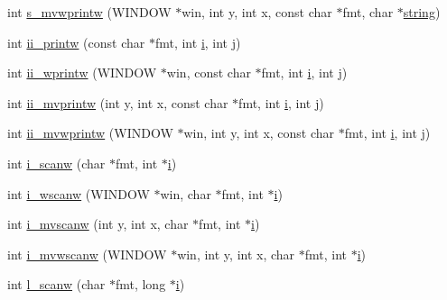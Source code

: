 \begin{DoxyCompactItemize}
\item 
int \hyperlink{C-macros_8c_a34a56ec22fc3813b4971c20eb6d699ff}{s\+\_\+mvwprintw} (W\+I\+N\+D\+OW $\ast$win, int y, int x, const char $\ast$fmt, char $\ast$\hyperlink{what__overview_81_8txt_a74cb7e955273b9f9157b4f0c18a38849}{string})
\item 
int \hyperlink{C-macros_8c_a485ef33f3e0fb3900f69d4b869b619f1}{ii\+\_\+printw} (const char $\ast$fmt, int \hyperlink{intro__blas1_83_8txt_a8ba82a50c0c2c12d5f6a77f7e4651c0b}{i}, int \hyperlink{exit_87_8txt_a8921ef29c441e427867c54bd3b2462ba}{j})
\item 
int \hyperlink{C-macros_8c_ab8f1d3103aca01f9fdbbf7017ecf968b}{ii\+\_\+wprintw} (W\+I\+N\+D\+OW $\ast$win, const char $\ast$fmt, int \hyperlink{intro__blas1_83_8txt_a8ba82a50c0c2c12d5f6a77f7e4651c0b}{i}, int \hyperlink{exit_87_8txt_a8921ef29c441e427867c54bd3b2462ba}{j})
\item 
int \hyperlink{C-macros_8c_ada22ee1895688f4926d3109021e89e33}{ii\+\_\+mvprintw} (int y, int x, const char $\ast$fmt, int \hyperlink{intro__blas1_83_8txt_a8ba82a50c0c2c12d5f6a77f7e4651c0b}{i}, int \hyperlink{exit_87_8txt_a8921ef29c441e427867c54bd3b2462ba}{j})
\item 
int \hyperlink{C-macros_8c_aba1dee7f00e339e2bcd867896705bbf0}{ii\+\_\+mvwprintw} (W\+I\+N\+D\+OW $\ast$win, int y, int x, const char $\ast$fmt, int \hyperlink{intro__blas1_83_8txt_a8ba82a50c0c2c12d5f6a77f7e4651c0b}{i}, int \hyperlink{exit_87_8txt_a8921ef29c441e427867c54bd3b2462ba}{j})
\item 
int \hyperlink{C-macros_8c_a753154950200b717bb172493ec09eca0}{i\+\_\+scanw} (char $\ast$fmt, int $\ast$\hyperlink{intro__blas1_83_8txt_a8ba82a50c0c2c12d5f6a77f7e4651c0b}{i})
\item 
int \hyperlink{C-macros_8c_a3fcdb7ea0752fda8505aa52f2306619f}{i\+\_\+wscanw} (W\+I\+N\+D\+OW $\ast$win, char $\ast$fmt, int $\ast$\hyperlink{intro__blas1_83_8txt_a8ba82a50c0c2c12d5f6a77f7e4651c0b}{i})
\item 
int \hyperlink{C-macros_8c_a31b17f5fa08e8b64e9b314300f548c33}{i\+\_\+mvscanw} (int y, int x, char $\ast$fmt, int $\ast$\hyperlink{intro__blas1_83_8txt_a8ba82a50c0c2c12d5f6a77f7e4651c0b}{i})
\item 
int \hyperlink{C-macros_8c_ac0518e313ddc0b8e826cfb049c36e257}{i\+\_\+mvwscanw} (W\+I\+N\+D\+OW $\ast$win, int y, int x, char $\ast$fmt, int $\ast$\hyperlink{intro__blas1_83_8txt_a8ba82a50c0c2c12d5f6a77f7e4651c0b}{i})
\item 
int \hyperlink{C-macros_8c_ac941da9228821610096cdf7a8dc6af56}{l\+\_\+scanw} (char $\ast$fmt, long $\ast$\hyperlink{intro__blas1_83_8txt_a8ba82a50c0c2c12d5f6a77f7e4651c0b}{i})

\end{DoxyCompactItemize}
